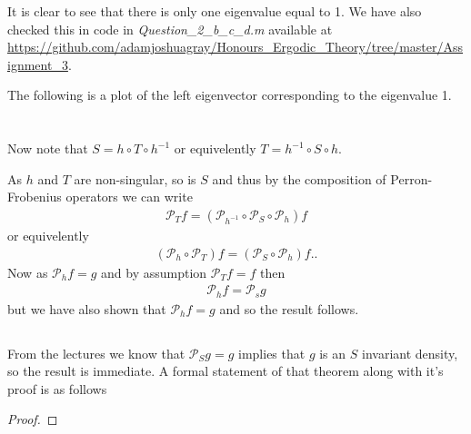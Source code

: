 \documentclass{unswmaths}
\begin{document}
It is clear to see that there is only one eigenvalue equal to 1. We have also checked this in code in \emph{Question\_2\_b\_c\_d.m} available at \url{https://github.com/adamjoshuagray/Honours_Ergodic_Theory/tree/master/Assignment_3}.

The following is a plot of the left eigenvector corresponding to the eigenvalue 1.

\section{}
\subsection{}

Now note that $ S = h \circ T \circ h^{-1} $ or equivelently $ T = h^{-1} \circ S \circ h $.

As $ h $ and $ T $ are non-singular, so is $ S $ and thus by the composition of Perron-Frobenius operators
we can write
\begin{align}
    \mathcal{P}_T f = \left( \mathcal{P}_{h^{-1}} \circ \mathcal{P}_{S} \circ \mathcal{P}_{h} \right) f
\end{align}
or equivelently
\begin{align}
    \left( \mathcal{P}_{h} \circ \mathcal{P}_T \right) f = \left( \mathcal{P}_{S} \circ \mathcal{P}_{h} \right) f..
\end{align}
Now as $ \mathcal{P}_h f = g $ and by assumption $ \mathcal{P}_T f = f $ then
\begin{align}
    \mathcal{P}_h f = \mathcal{P}_s g
\end{align}
but we have also shown that $ \mathcal{P}_h f = g $
and so the result follows.
\subsection{}
From the lectures we know that $ \mathcal{P}_S g = g $ implies that $ g $ is an $ S $ invariant density, so the result is immediate.
A formal statement of that theorem along with it's proof is as follows
\begin{theorem}
\end{theorem}
\begin{proof}
\end{proof}
\subsection{}
\section{}
\end{document}
